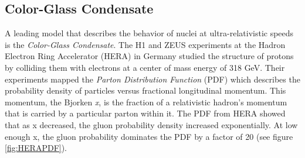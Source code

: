 \subsection{Color-Glass Condensate}
A leading model that describes the behavior of nuclei at ultra-relativistic speeds is the \textit{Color-Glass Condensate}. The H1 and ZEUS experiments at the Hadron Electron Ring Accelerator (HERA) in Germany studied the structure of protons by colliding them with electrons at a center of mass energy of 318 GeV\citep{Abramowicz2015}. Their experiments mapped the \textit{Parton Distribution Function} (PDF) which describes the probability density of particles versus fractional longitudinal momentum. This momentum, the Bjorken \textit{x}, is the fraction of a relativistic hadron's momentum that is carried by a particular parton within it. The PDF from HERA showed that as x decreased, the gluon probability density increased exponentially. At low enough x, the gluon probability dominates the PDF by a factor of 20 (see figure \ref{fig:HERAPDF}). 

